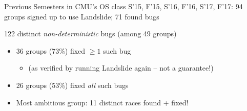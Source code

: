 \documentclass[xcolor=dvipsnames]{beamer}
\begin{document}
\begin{frame}{Previous Semesters in CMU's OS class}
	S'15, F'15, S'16, F'16, S'17, F'17: 94 groups signed up to use Landslide; 71 found bugs
	\linegap



	122 distinct {\em non-deterministic} bugs (among 49 groups)
	\begin{itemize}
		\item 36 groups (73\%) fixed $\ge 1$ such bug
			\begin{itemize}
				\item (as verified by running Landslide again -- not a guarantee!)
			\end{itemize}
		\item 26 groups (53\%) fixed {\em all} such bugs
		\item Most ambitious group: 11 distinct races found + fixed!
	\end{itemize}
	\linegap
\end{frame}
\end{document}
